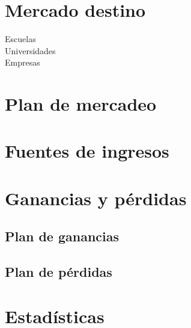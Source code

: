 \documentclass[12pt,spanish,lettersize]{article}
\begin{document}
\section{Mercado destino}
\begin{description}
\item[Escuelas]
\item[Universidades]
\item[Empresas]
\end{description}
\section{Plan de mercadeo}
\section{Fuentes de ingresos}
\section{Ganancias y p\'erdidas}
\subsection{Plan de ganancias}
\subsection{Plan de p\'erdidas}

\section{Estad\'isticas}
\end{document}
